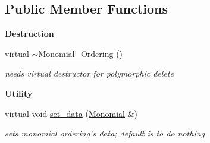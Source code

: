 \subsection*{Public Member Functions}
\begin{Indent}\textbf{ Destruction}\par
\begin{DoxyCompactItemize}
\item 
\mbox{\label{class_monomial___ordering_a6f507bd325e959ce867880d4696a99cc}} 
virtual \hyperlink{class_monomial___ordering_a6f507bd325e959ce867880d4696a99cc}{$\sim$\+Monomial\+\_\+\+Ordering} ()
\begin{DoxyCompactList}\small\item\em needs virtual destructor for polymorphic {\ttfamily delete} \end{DoxyCompactList}\end{DoxyCompactItemize}
\end{Indent}
\begin{Indent}\textbf{ Utility}\par
\begin{DoxyCompactItemize}
\item 
\mbox{\label{class_monomial___ordering_ae7e09d51f301b747b836ba54a79a85d3}} 
virtual void \hyperlink{class_monomial___ordering_ae7e09d51f301b747b836ba54a79a85d3}{set\+\_\+data} (\hyperlink{class_monomial}{Monomial} \&)
\begin{DoxyCompactList}\small\item\em sets monomial ordering's data; default is to do nothing \end{DoxyCompactList}\end{DoxyCompactItemize}
\end{Indent}
